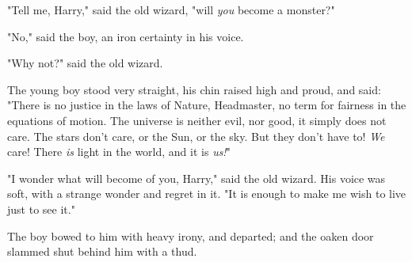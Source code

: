 "Tell me, Harry," said the old wizard, "will \emph{you} become a monster?"

"No," said the boy, an iron certainty in his voice.

"Why not?" said the old wizard.

The young boy stood very straight, his chin raised high and proud, and said:
"There is no justice in the laws of Nature, Headmaster, no term for fairness in
the equations of motion. The universe is neither evil, nor good, it simply does
not care. The stars don’t care, or the Sun, or the sky. But they don’t have to!
\emph{We} care! There \emph{is} light in the world, and it is \emph{us!}"

"I wonder what will become of you, Harry," said the old wizard. His voice was
soft, with a strange wonder and regret in it. "It is enough to make me wish to
live just to see it."

The boy bowed to him with heavy irony, and departed; and the oaken door slammed
shut behind him with a thud.
